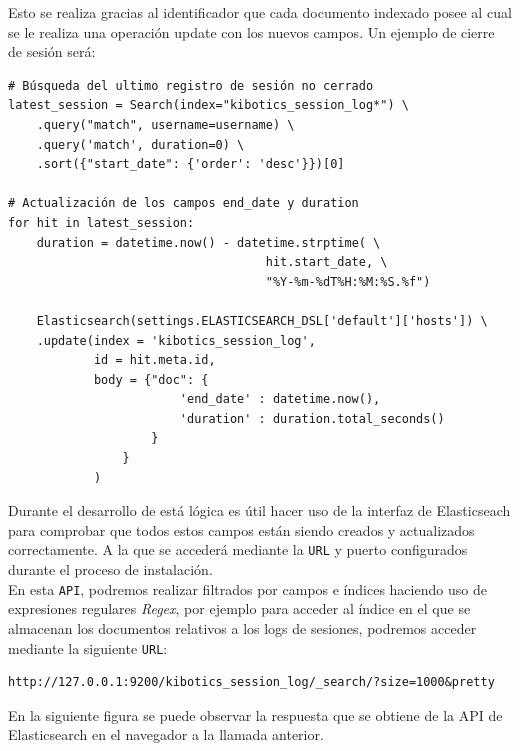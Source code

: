 \documentclass[11pt,a4paper]{book}
\begin{document}
				Esto se realiza gracias al identificador que cada documento indexado posee al cual se le realiza una operación update con los nuevos campos. Un ejemplo de cierre de sesión será:
				
				\begin{Verbatim}[tabsize=4]
# Búsqueda del ultimo registro de sesión no cerrado
latest_session = Search(index="kibotics_session_log*") \
	.query("match", username=username) \
	.query('match', duration=0) \
	.sort({"start_date": {'order': 'desc'}})[0]

# Actualización de los campos end_date y duration
for hit in latest_session:
	duration = datetime.now() - datetime.strptime( \
									hit.start_date, \
	 								"%Y-%m-%dT%H:%M:%S.%f")
	 
	Elasticsearch(settings.ELASTICSEARCH_DSL['default']['hosts']) \
	.update(index = 'kibotics_session_log', 
			id = hit.meta.id,
			body = {"doc": {
						'end_date' : datetime.now(), 
						'duration' : duration.total_seconds()
					}
				}
			)
				\end{Verbatim}
				
				Durante el desarrollo de está lógica es útil hacer uso de la interfaz de Elasticseach para comprobar que todos estos campos están siendo creados y actualizados correctamente. A la que se accederá mediante la \texttt{URL} y puerto configurados durante el proceso de instalación.\\
				
				En esta \texttt{API}, podremos realizar filtrados por campos e índices haciendo uso de expresiones regulares \textit{Regex}, por ejemplo para acceder al índice en el que se almacenan los documentos relativos a los logs de sesiones, podremos acceder mediante la siguiente \texttt{URL}:
				
				\begin{Verbatim}[tabsize=4]	
http://127.0.0.1:9200/kibotics_session_log/_search/?size=1000&pretty
				\end{Verbatim}

				En la siguiente figura se puede observar la respuesta que se obtiene de la API de Elasticsearch en el navegador a la llamada anterior.
					
\end{document}
